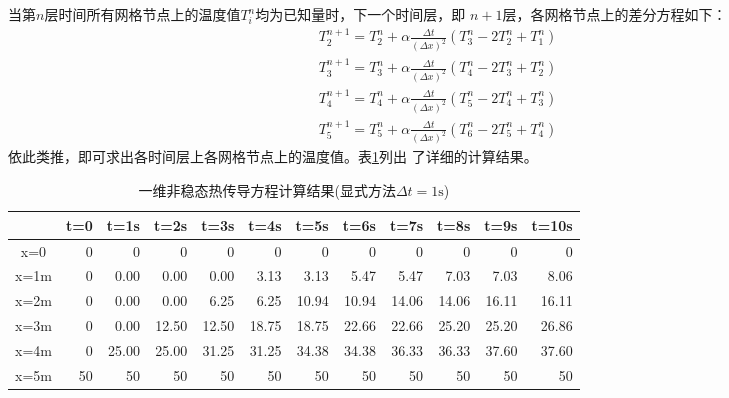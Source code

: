 当第$n$层时间所有网格节点上的温度值$T_{i}^{n}$均为已知量时，下一个时间层，即
$n+1$层，各网格节点上的差分方程如下：
\begin{equation}
\begin{aligned}
  T_{2}^{n+1} = 
  T_{2}^{n} 
  +
  \alpha\frac{\Delta t}{(\Delta x)^{2}}
  (T_{3}^{n}-2T_{2}^{n}+T_{1}^{n})
  \\
  T_{3}^{n+1} = 
  T_{3}^{n} 
  +
  \alpha\frac{\Delta t}{(\Delta x)^{2}}
  (T_{4}^{n}-2T_{3}^{n}+T_{2}^{n})
\\
  T_{4}^{n+1} = 
  T_{4}^{n} 
  +
  \alpha\frac{\Delta t}{(\Delta x)^{2}}
  (T_{5}^{n}-2T_{4}^{n}+T_{3}^{n})
  \\
  T_{5}^{n+1} = 
  T_{5}^{n} 
  +
  \alpha\frac{\Delta t}{(\Delta x)^{2}}
  (T_{6}^{n}-2T_{5}^{n}+T_{4}^{n})
\end{aligned}
\end{equation}
依此类推，即可求出各时间层上各网格节点上的温度值。表\ref{TbBD_1dht_result1}列出
了详细的计算结果。
\begin{table}[h!]
  \begin{center}
  \caption{一维非稳态热传导方程计算结果(显式方法$\Delta t=1\mathrm{s}$)}
  \label{TbBD_1dht_result1}
  \begin{tabular}{|c|r|r|r|r|r|r|r|r|r|r|r|}
    \hline
 & t=0 & t=1s & t=2s & t=3s & t=4s & t=5s & t=6s & t=7s & t=8s & t=9s & t=10s
 \\
  \hline
x=0 & 0 & 0 & 0 & 0 & 0 & 0 & 0 & 0 & 0 & 0 & 0
\\
    \hline
x=1m & 0 & 0.00  & 0.00  & 0.00  & 3.13  & 3.13  & 5.47  & 5.47  & 7.03  & 7.03
     & 8.06  
     \\
    \hline
x=2m & 0 & 0.00  & 0.00  & 6.25  & 6.25  & 10.94  & 10.94  & 14.06  & 14.06  &
16.11  & 16.11  
\\
    \hline
x=3m & 0 & 0.00  & 12.50  & 12.50  & 18.75  & 18.75  & 22.66  & 22.66  & 25.20
     & 25.20  & 26.86 
     \\
    \hline
x=4m & 0 & 25.00  & 25.00  & 31.25  & 31.25  & 34.38  & 34.38  & 36.33  & 36.33
     & 37.60  & 37.60 
     \\
    \hline
x=5m & 50 & 50 & 50 & 50 & 50 & 50 & 50 & 50 & 50 & 50 & 50
\\
    \hline
  \end{tabular}
  \end{center}
\end{table}

